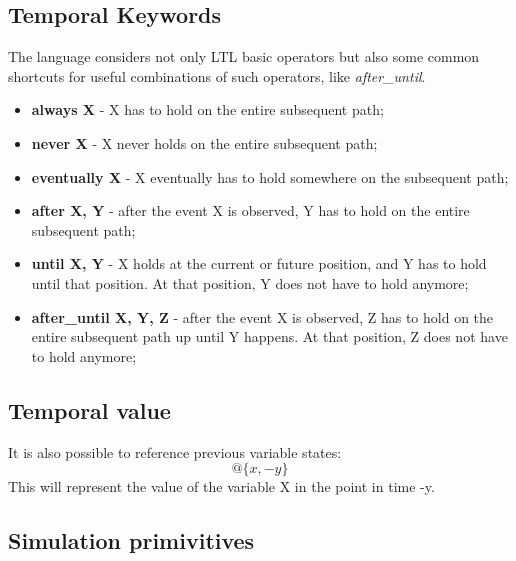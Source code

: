 \subsection{Temporal Keywords}
\label{ssec:tempkeywords}

The language considers not only LTL basic operators but also some common shortcuts for useful combinations of such operators, like \textit{after\_until}.

\begin{itemize}
\item {\bfseries always X} - X has to hold on the entire subsequent path;
\item {\bfseries never X} - X never holds on the entire subsequent path;
\item {\bfseries eventually X} - X eventually has to hold somewhere on the subsequent path;
\item {\bfseries after X, Y} - after the event X is observed, Y has to hold on the entire subsequent path;
\item {\bfseries until X, Y} - X holds at the current or future position, and Y has to hold until that position. At that position, Y does not have to hold anymore;
\item {\bfseries after\_until X, Y, Z} - after the event X is observed, Z has to hold on the entire subsequent path up until Y happens. At that position, Z does not have to hold anymore;
\end{itemize}


\subsection{Temporal value}
\label{ssec:tempvalues}

It is also possible to reference previous variable states:
\begin{equation}
@\{x, -y\}
\end{equation}
This will represent the value of the variable X in the point in time -y.


\subsection{Simulation primivitives}
\label{ssec:simprimitives}

